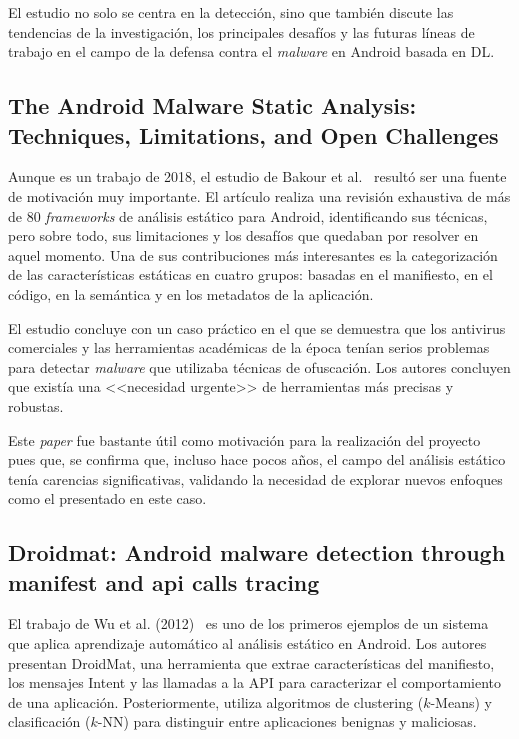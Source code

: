 El estudio no solo se centra en la detección, sino que también discute las tendencias de la investigación, los principales desafíos y las futuras líneas de trabajo en el campo de la defensa contra el \textit{malware} en Android basada en DL.

\subsection{The Android Malware Static Analysis: Techniques, Limitations, and Open Challenges}

Aunque es un trabajo de 2018, el estudio de Bakour et al.~\cite{8566573} resultó ser una fuente de motivación muy importante. El artículo realiza una revisión exhaustiva de más de 80 \textit{frameworks} de análisis estático para Android, identificando sus técnicas, pero sobre todo, sus limitaciones y los desafíos que quedaban por resolver en aquel momento. Una de sus contribuciones más interesantes es la categorización de las características estáticas en cuatro grupos: basadas en el manifiesto, en el código, en la semántica y en los metadatos de la aplicación.

El estudio concluye con un caso práctico en el que se demuestra que los antivirus comerciales y las herramientas académicas de la época tenían serios problemas para detectar \textit{malware} que utilizaba técnicas de ofuscación. Los autores concluyen que existía una <<necesidad urgente>> de herramientas más precisas y robustas.

Este \textit{paper} fue bastante útil como motivación para la realización del proyecto pues que, se confirma que, incluso hace pocos años, el campo del análisis estático tenía carencias significativas, validando la necesidad de explorar nuevos enfoques como el presentado en este caso.

\subsection{Droidmat: Android malware detection through manifest and api calls tracing}

El trabajo de Wu et al. (2012)~\cite{wu2012droidmat} es uno de los primeros ejemplos de un sistema que aplica aprendizaje automático al análisis estático en Android. Los autores presentan DroidMat, una herramienta que extrae características del manifiesto, los mensajes Intent y las llamadas a la API para caracterizar el comportamiento de una aplicación. Posteriormente, utiliza algoritmos de clustering ($k$-Means) y clasificación ($k$-NN) para distinguir entre aplicaciones benignas y maliciosas.


